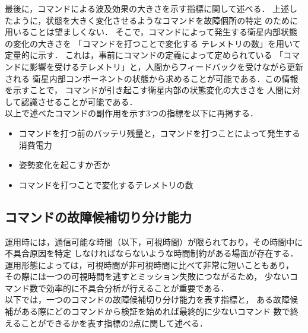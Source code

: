 \documentclass[11pt]{jsreport}
\begin{document}
最後に，コマンドによる波及効果の大きさを示す指標に関して述べる．
上述したように，状態を大きく変化させるようなコマンドを故障個所の特定
のために用いることは望ましくない．
そこで，コマンドによって発生する衛星内部状態の変化の大きさを
「コマンドを打つことで変化する
テレメトリの数」を用いて定量的に示す．
これは，事前にコマンドの定義によって定められている
「コマンドに影響を受けるテレメトリ」と，人間からフィードバックを受けながら更新される
衛星内部コンポーネントの状態から求めることが可能である．この情報を示すことで，
コマンドが引き起こす衛星内部の状態変化の大きさを
人間に対して認識させることが可能である．\\
以上で述べたコマンドの副作用を示す3つの指標を以下に再掲する．
\begin{itemize}
   \item コマンドを打つ前のバッテリ残量と，コマンドを打つことによって発生する消費電力
   \item 姿勢変化を起こすか否か
   \item コマンドを打つことで変化するテレメトリの数
\end{itemize}

\subsection{コマンドの故障候補切り分け能力}
運用時には，通信可能な時間（以下，可視時間）が限られており，その時間中に不具合原因を特定
しなければならないような時間制約がある場面が存在する．
運用形態によっては，可視時間が非可視時間に比べて非常に短いこともあり，
その際には一つの可視時間を逃すとミッション失敗につながるため，%
少ないコマンド数で効率的に不具合分析が行えることが重要である．\\
以下では，一つのコマンドの故障候補切り分け能力を表す指標と，
ある故障候補がある際にどのコマンドから検証を始めれば最終的に少ないコマンド
数で終えることができるかを表す指標の2点に関して述べる．
\end{document}
